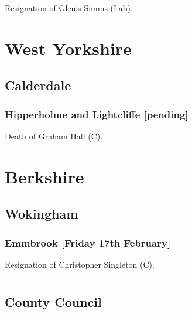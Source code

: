 \documentclass[a4paper,openany]{book}
\begin{document}
\begin{resultsiii}

Resignation of Glenis Simms (Lab).

\section{West Yorkshire}

\subsection*{Calderdale}

\subsubsection*{Hipperholme and Lightcliffe \hspace*{\fill}\nolinebreak[1]%
\enspace\hspace*{\fill}
[pending]}


Death of Graham Hall (C).

\section{Berkshire}

\subsection*{Wokingham}

\subsubsection*{Emmbrook \hspace*{\fill}\nolinebreak[1]%
\enspace\hspace*{\fill}
[Friday 17th February]}


Resignation of Christopher Singleton (C).

\section[Buckinghamshire]{}

\subsection*{County Council}


\end{resultsiii}
\end{document}
